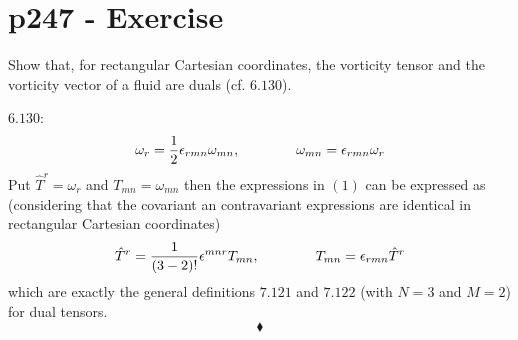 \section{p247 - Exercise }
\begin{tcolorbox}
Show that, for rectangular Cartesian coordinates, the vorticity tensor and the vorticity vector of a fluid are duals (cf. $\mathbf{6.130}$).
\end{tcolorbox}
$\mathbf{6.130}$:
\begin{align}
\omega_r=\frac{1}{2}\epsilon_{rmn}\omega_{mn},\quad\quad\quad\quad \omega_{mn}=\epsilon_{rmn}\omega_r
\end{align}
Put $\hat{T}^r= \omega_r$ and $T_{mn} = \omega_{mn}$
then the expressions in $(1)$ can be expressed as (considering that the covariant an contravariant expressions are identical in rectangular Cartesian coordinates) 
\begin{align*}
\hat{T}^r=\frac{1}{(3-2)!}\epsilon^{mnr}T_{mn},\quad\quad\quad\quad T_{mn}=\epsilon_{rmn}\hat{T}^r
\end{align*}
which are exactly the general definitions $\mathbf{7.121}$ and $\mathbf{7.122}$ (with $N=3$ and $M=2$) for dual tensors.
$$\blacklozenge$$
\newpage



